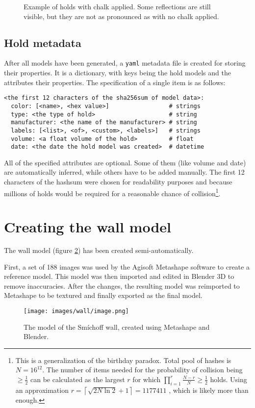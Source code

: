 \begin{figure}[h]
	\centering
	\hfill
	\hfill
	\caption{Example of holds with chalk applied. Some reflections are still visible, but they are not as pronounced as with no chalk applied.}%
	\label{fig:chalk}
\end{figure}

\subsection{Hold metadata}
After all models have been generated, a \verb|yaml| metadata file is created for storing their properties.
It is a dictionary, with keys being the hold models and the attributes their properties.
The specification of a single item is as follows:

\begin{verbatim}
<the first 12 characters of the sha256sum of model data>:
  color: [<name>, <hex value>]                 # strings
  type: <the type of hold>                     # string
  manufacturer: <the name of the manufacturer> # string
  labels: [<list>, <of>, <custom>, <labels>]   # strings
  volume: <a float volume of the hold>         # float
  date: <the date the hold model was created>  # datetime
\end{verbatim}

All of the specified attributes are optional.
Some of them (like volume and date) are automatically inferred, while others have to be added manually.
The first 12 characters of the hashsum were chosen for readability purposes and because millions of holds would be required for a reasonable chance of collision\footnote{This is a generalization of the birthday paradox. Total pool of hashes is $N = 16^{12}$. The number of items needed for the probability of collision being $\ge \frac{1}{2}$ can be calculated as the largest $r$ for which $\prod_{i = 1}^{r} \frac{N - r}{N} \ge \frac{1}{2}$ holds. Using an approximation $r = \left\lceil \sqrt{2N \ln 2} + 1 \right\rceil = 1177411$ \cite{brink2012probably}, which is likely more than enough.}.

\section{Creating the wall model}
The wall model (figure \ref{fig:model}) has been created semi-automatically.

First, a set of 188 images was used by the Agisoft Metashape software to create a reference model.
This model was then imported and edited in Blender 3D to remove inaccuracies.
After the changes, the resulting model was reimported to Metashape to be textured and finally exported as the final model.

\begin{figure}[t]
	\centering
	\texttt{[image: images/wall/image.png]}
	\caption{The model of the Smíchoff wall, created using Metashape and Blender.}
	\label{fig:model}
\end{figure}
